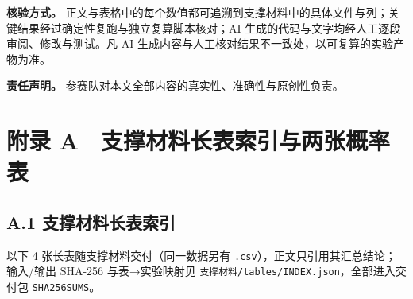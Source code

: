 \documentclass[11pt,a4paper]{article}
\begin{document}
\textbf{核验方式。}
正文与表格中的每个数值都可追溯到支撑材料中的具体文件与列；关键结果经过确定性复跑与独立复算脚本核对；AI
生成的代码与文字均经人工逐段审阅、修改与测试。凡 AI
生成内容与人工核对结果不一致处，以可复算的实验产物为准。

\textbf{责任声明。} 参赛队对本文全部内容的真实性、准确性与原创性负责。

\newpage
\appendix

\section*{附录
A　支撑材料长表索引与两张概率表}\label{ux9644ux5f55-a-ux652fux6491ux6750ux6599ux957fux8868ux7d22ux5f15ux4e0eux4e24ux5f20ux6982ux7387ux8868}

\subsection*{A.1
支撑材料长表索引}\label{a.1-ux652fux6491ux6750ux6599ux957fux8868ux7d22ux5f15}

以下 4 张长表随支撑材料交付（同一数据另有
\texttt{.csv}），正文只引用其汇总结论；输入/输出 SHA-256 与表→实验映射见
\texttt{支撑材料/\allowbreak{}tables/\allowbreak{}INDEX.json}，全部进入交付包
\texttt{SHA256SUMS}。
\end{document}
